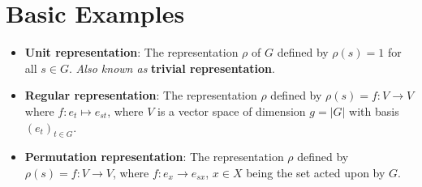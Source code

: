 \documentclass[../notes.tex]{subfiles}
\begin{document}
\section{Basic Examples}
\begin{itemize}
    \item \textbf{Unit representation}: The representation $\rho$ of $G$ defined by $\rho(s)=1$ for all $s\in G$. \emph{Also known as} \textbf{trivial representation}.
    \item \textbf{Regular representation}: The representation $\rho$ defined by $\rho(s)=f:V\to V$ where $f:e_t\mapsto e_{st}$, where $V$ is a vector space of dimension $g=|G|$ with basis $(e_t)_{t\in G}$.
    \item \textbf{Permutation representation}: The representation $\rho$ defined by $\rho(s)=f:V\to V$, where $f:e_x\to e_{sx}$, $x\in X$ being the set acted upon by $G$.
\end{itemize}
\end{document}
